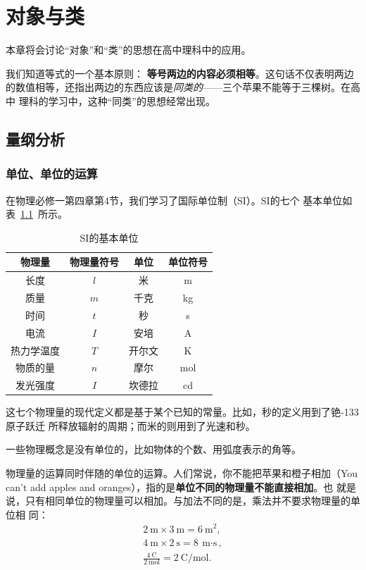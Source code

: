 \chapter{对象与类}\label{chap:class}

本章将会讨论“对象”和“类”的思想在高中理科中的应用。

我们知道等式的一个基本原则： \textbf{等号两边的内容必须相等}。这句话不仅表明两边
的数值相等，还指出两边的东西应该是\emph{同类的}——三个苹果不能等于三棵树。在高中
理科的学习中，这种“同类”的思想经常出现。

\section{量纲分析}

\subsection{单位、单位的运算}

在物理必修一第四章第4节，我们学习了国际单位制（SI）。SI的七个
基本单位如表~\ref{tbl:si_units}~所示。

\begin{table}[ht]
    \centering
    \caption{SI的基本单位}\label{tbl:si_units}
    \begin{tabular}{cccc}
        \toprule
        物理量 & 物理量符号 & 单位 & 单位符号 \\
        \midrule
        长度 & $l$ & 米 & \unit{m} \\
        质量 & $m$ & 千克 & \unit{kg} \\
        时间 & $t$ & 秒 & \unit{s} \\
        电流 & $I$ & 安培 & \unit{A} \\
        热力学温度 & $T$ & 开尔文 & \unit{K} \\
        物质的量 & $n$ & 摩尔 & \unit{mol} \\
        发光强度 & $I$ & 坎德拉 & \unit{cd} \\
        \bottomrule
    \end{tabular}
\end{table}

这七个物理量的现代定义都是基于某个已知的常量。比如，秒的定义用到了铯-133原子跃迁
所释放辐射的周期；而米的则用到了光速和秒。

一些物理概念是没有单位的，比如物体的个数、用弧度表示的角等。

物理量的运算同时伴随的单位的运算。人们常说，你不能把苹果和橙子相加（You 
can't add apples and oranges），指的是\textbf{单位不同的物理量不能直接相加}。也
就是说，只有相同单位的物理量可以相加。与加法不同的是，乘法并不要求物理量的单位相
同：
\begin{gather*}
    \qty{2}{\meter} \times \qty{3}{\meter} = \qty{6}{\meter^2},\\
    \qty{4}{\meter} \times \qty{2}{\second} = \qty{8}{\meter\cdot\second},\\
    \frac{\qty{4}{\coulomb}}{\qty{2}{\mole}} = \qty{2}{\coulomb\per\mole}.\\
\end{gather*}


